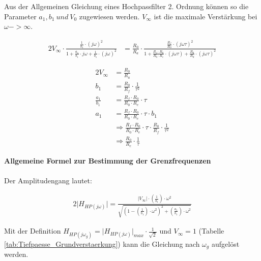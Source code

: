 \noindent Aus der Allgemeinen Gleichung eines Hochpassfilter 2. Ordnung können so die Parameter $a_{1}, b_{1}~und~V_{0}$ zugewiesen werden. $V_{\infty}$ ist die maximale Verstärkung bei $\omega -> \infty$.

\begin{alignat}{2}
V_{\infty} \cdot \frac{ \frac{1}{b_{1}} \cdot (j \omega)^2}{1 + \frac{a_{1}}{b_{1}} \cdot j \omega + \frac{1}{b_{1}} \cdot \left ( j \omega \right)^2} &= \frac{R_{0}}{R_{a}} \cdot \frac{ \frac{R_{f} }{R_{0}} \cdot \left( j \omega \tau \right)^2  }{1+\frac{R_{f} \cdot R_{0}}{R_{0} \cdot R_{e}} \cdot  \left(j \omega \tau \right) + \frac{R_{0}}{R_{d}} \cdot \left ( j \omega \tau \right)^2}
\end{alignat}

\begin{alignat}{2}
V_{\infty} &= \frac{R_{0}}{R_{a}}\\
b_{1} &= \frac{R_{0}}{R_{f}} \cdot \frac{1}{\tau^2}\\
\frac{a_{1}}{b_{1}} &= \frac{R_{f} \cdot R_{0}}{R_{0} \cdot R_{e}} \cdot \tau\\
a_{1} &= \frac{R_{f} \cdot R_{0}}{R_{0} \cdot R_{e} } \cdot \tau \cdot b_{1}\\
&\Rightarrow \frac{R_{f} \cdot R_{0}}{R_{0} \cdot R_{e} } \cdot \tau \cdot \frac{R_{0}}{R_{f}} \cdot \frac{1}{\tau^2}\\
&\Rightarrow \frac{R_{0}}{R_{e}} \cdot \frac{1}{\tau}
\end{alignat}

\newpage

\noindent \textbf{Allgemeine Formel zur Bestimmung der Grenzfrequenzen}\\\\

\noindent Der Amplitudengang lautet:

\begin{alignat}{2}
\lvert H_{HP (j \omega)} \rvert = \frac{\lvert V_{\infty} \rvert \cdot \left(\frac{1}{b_{1}} \right) \cdot \omega^2}{\sqrt{\left(1 - \left(\frac{1}{b_{1}} \right) \cdot \omega^2 \right)^2 + \left(\frac{a_{1}}{b_{1}} \right) \cdot \omega^2}}
\end{alignat}

\noindent Mit der Definition $H_{HP (j \omega_{g})} = \lvert H_{HP (j \omega)} \rvert_{max} \cdot \frac{1}{\sqrt{2}}$ und $V_{\infty} = 1$ (Tabelle \ref{tab:Tiefpaesse_Grundverstaerkung}) kann die Gleichung nach $\omega_{g}$ aufgelöst werden.

